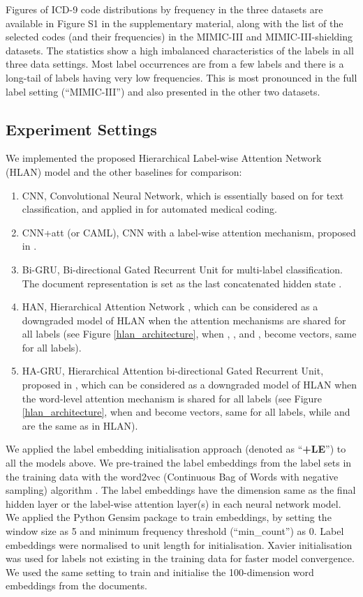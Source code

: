 \documentclass[final,5p,times,twocolumn]{elsarticle}
\begin{document}
Figures of ICD-9 code distributions by frequency in the three datasets are available in Figure S1 in the supplementary material, along with the list of the selected codes (and their frequencies) in the MIMIC-III and MIMIC-III-shielding datasets. The statistics show a high imbalanced characteristics of the labels in all three data settings. Most label occurrences are from a few labels and there is a long-tail of labels having very low frequencies. This is most pronounced in the full label setting (``MIMIC-III'') and also presented in the other two datasets.

\subsection{Experiment Settings}

We implemented the proposed Hierarchical Label-wise Attention Network (HLAN) model and the other baselines for comparison:
\begin{enumerate}
    \item CNN, Convolutional Neural Network, which is essentially based on \cite{kim-2014-convolutional} for text classification, and applied in \cite{karimi-etal-2017-automatic,gehrmann2018} for automated medical coding.
    \item CNN+att (or CAML), CNN with a label-wise attention mechanism, proposed in \cite{mullenbach-etal-2018-explainable}.
    \item Bi-GRU, Bi-directional Gated Recurrent Unit \cite{cho2014} for multi-label classification. The document representation is set as the last concatenated hidden state  .
    \item HAN, Hierarchical Attention Network \cite{yang2016}, which can be considered as a downgraded model of HLAN when the attention mechanisms are shared for all labels (see Figure \ref{hlan_architecture}, when , , and ,  become vectors, same for all labels).
    \item HA-GRU, Hierarchical Attention bi-directional Gated Recurrent Unit, proposed in \cite{baumel2018multi}, which can be considered as a downgraded model of HLAN when the word-level attention mechanism is shared for all labels (see Figure \ref{hlan_architecture}, when  and  become vectors, same for all labels, while  and  are the same as in HLAN).
\end{enumerate}

We applied the label embedding initialisation approach (denoted as ``\textbf{+LE}'') to all the models above. We pre-trained the label embeddings  from the label sets in the training data with the word2vec (Continuous Bag of Words with negative sampling) algorithm \cite{mikolov2013distributed}. The label embeddings have the dimension same as the final hidden layer or the label-wise attention layer(s) in each neural network model. We applied the Python Gensim package \cite{rehurek_lrec2010} to train embeddings, by setting the window size as 5 and minimum frequency threshold (``min\_count'') as 0. Label embeddings were normalised to unit length for initialisation. Xavier initialisation \cite{glorot2010} was used for labels not existing in the training data for faster model convergence. We used the same setting to train and initialise the 100-dimension word embeddings  from the documents.
\end{document}

